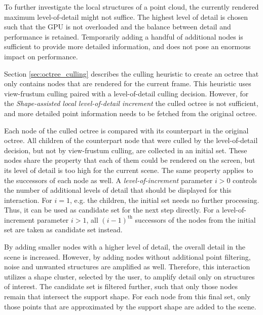 To further investigate the local structures of a point cloud, the currently rendered maximum level-of-detail might not suffice. The highest level of detail is chosen such that the GPU is not overloaded and the balance between detail and performance is retained. Temporarily adding a handful of additional nodes is sufficient to provide more detailed information, and does not pose an enormous impact on performance. 
    
\par

Section \ref{sec:octree_culling} describes the culling heuristic to create an octree that only contains nodes that are rendered for the current frame. This heuristic uses view-frustum culling paired with a level-of-detail culling decision. However, for the \textit{Shape-assisted local level-of-detail increment} the culled octree is not sufficient, and more detailed point information needs to be fetched from the original octree. 

\par

Each node of the culled octree is compared with its counterpart in the original octree. All children of the counterpart node that were culled by the level-of-detail decision, but not by view-frustum culling, are collected in an initial set. These nodes share the property that each of them could be rendered on the screen, but its level of detail is too high for the current scene. The same property applies to the successors of each node as well. A \textit{level-of-increment} parameter $i > 0$ controls the number of additional levels of detail that should be displayed for this interaction. For $i=1$, e.g. the children, the initial set needs no further processing. Thus, it can be used as candidate set for the next step directly. For a level-of-increment parameter $i>1$, all $(i-1)^{\text{th}}$ successors of the nodes from the initial set are taken as candidate set instead. 

\par

By adding smaller nodes with a higher level of detail, the overall detail in the scene is increased. However, by adding nodes without additional point filtering, noise and unwanted structures are amplified as well. Therefore, this interaction utilizes a shape cluster, selected by the user, to amplify detail only on structures of interest. The candidate set is filtered further, such that only those nodes remain that intersect the support shape. For each node from this final set, only those points that are approximated by the support shape are added to the scene.

